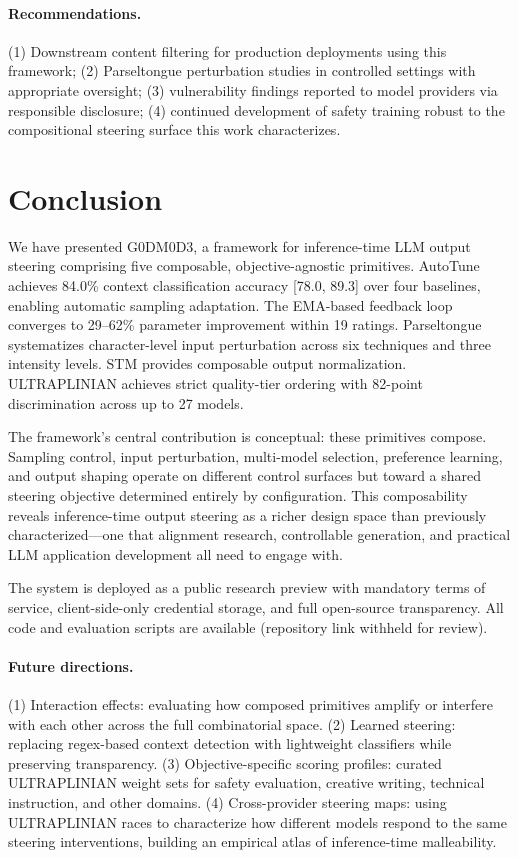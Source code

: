 \documentclass[11pt]{article}
\begin{document}
\paragraph{Recommendations.} (1) Downstream content filtering for production deployments using this framework; (2) Parseltongue perturbation studies in controlled settings with appropriate oversight; (3) vulnerability findings reported to model providers via responsible disclosure; (4) continued development of safety training robust to the compositional steering surface this work characterizes.

\section{Conclusion}

We have presented \textsc{G0DM0D3}, a framework for inference-time LLM output steering comprising five composable, objective-agnostic primitives. AutoTune achieves 84.0\% context classification accuracy [78.0, 89.3] over four baselines, enabling automatic sampling adaptation. The EMA-based feedback loop converges to 29--62\% parameter improvement within 19 ratings. Parseltongue systematizes character-level input perturbation across six techniques and three intensity levels. STM provides composable output normalization. ULTRAPLINIAN achieves strict quality-tier ordering with 82-point discrimination across up to 27 models.

The framework's central contribution is conceptual: these primitives compose. Sampling control, input perturbation, multi-model selection, preference learning, and output shaping operate on different control surfaces but toward a shared steering objective determined entirely by configuration. This composability reveals inference-time output steering as a richer design space than previously characterized---one that alignment research, controllable generation, and practical LLM application development all need to engage with.

The system is deployed as a public research preview with mandatory terms of service, client-side-only credential storage, and full open-source transparency. All code and evaluation scripts are available (repository link withheld for review).

\paragraph{Future directions.} (1) Interaction effects: evaluating how composed primitives amplify or interfere with each other across the full combinatorial space. (2) Learned steering: replacing regex-based context detection with lightweight classifiers while preserving transparency. (3) Objective-specific scoring profiles: curated ULTRAPLINIAN weight sets for safety evaluation, creative writing, technical instruction, and other domains. (4) Cross-provider steering maps: using ULTRAPLINIAN races to characterize how different models respond to the same steering interventions, building an empirical atlas of inference-time malleability.
\end{document}
